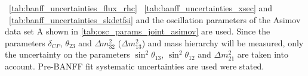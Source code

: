 \begin{table}[htb]
{~\ref{tab:banff_uncertainties_flux_rhc}
~\ref{tab:banff_uncertainties_xsec}
and
~\ref{tab:banff_uncertainties_skdetfsi}
and the oscillation parameters of the Asimov data set A shown in \cref{tab:osc_params_joint_asimov}
are used.
Since the parameters $\delta_{CP}$, $\theta_{23}$ and $\Delta m^2_{32}$ ($\Delta m^2_{13}$) and mass hierarchy
will be measured,
only the uncertainty on the parameters 
$\sin^2 \theta_{13}$,
$\sin^2 \theta_{12}$
and 
$\Delta m^2_{21}$ 
are taken into account.
Pre-BANFF fit systematic uncertainties are used were stated.
}                                                                                                                                                                                          
\label{tab:nsk_systematic_table_summary_joint_asimov_A_rhc_mulike}
\end{table}




